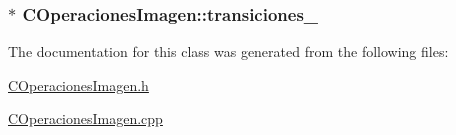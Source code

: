 \subsubsection[{\texorpdfstring{transiciones\+\_\+}{transiciones_}}]{$\ast$ C\+Operaciones\+Imagen\+::transiciones\+\_\+\hspace{0.3cm}{\ttfamily [private]}}\hypertarget{classCOperacionesImagen_a7ca38abb7714e00773895e8bcda443c1}{}\label{classCOperacionesImagen_a7ca38abb7714e00773895e8bcda443c1}


The documentation for this class was generated from the following files\+:\begin{DoxyCompactItemize}
\item 
\hyperlink{COperacionesImagen_8h}{C\+Operaciones\+Imagen.\+h}\item 
\hyperlink{COperacionesImagen_8cpp}{C\+Operaciones\+Imagen.\+cpp}\end{DoxyCompactItemize}
